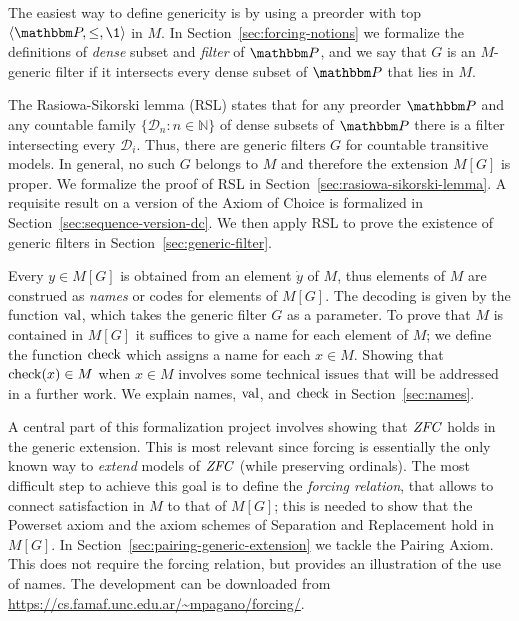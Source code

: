 The easiest way to define genericity is by using a preorder with top
$\lb\PP,\leq,\1\rb$ in $M$.   
In Section~\ref{sec:forcing-notions} we formalize the definitions of
\emph{dense} subset and  \emph{filter} of  $\PP$, and we say that  $G$
is an $M$-generic filter
if it intersects every dense subset of $\PP$ that lies in $M$.

The Rasiowa-Sikorski lemma (RSL) states that for any preorder $\PP$
and any countable family $\{\mathcal{D}_n : n\in\mathbb{N}\}$ of dense
subsets of $\PP$ there is a filter intersecting every
$\mathcal{D}_i$. Thus, there are generic filters $G$ for countable
transitive models. In general, no such $G$ belongs to $M$ and
therefore the extension $M[G]$ is proper. We formalize the proof of
RSL in Section~\ref{sec:rasiowa-sikorski-lemma}. A requisite result on
a version of the Axiom of Choice is formalized in
Section~\ref{sec:sequence-version-dc}. We then apply RSL to prove the
existence of generic filters in Section~\ref{sec:generic-filter}.

Every  $y \in M[G]$ is obtained from an element $\dot y$ of $M$, thus
elements of $M$ are construed as \emph{names} or codes for elements of
$M[G]$.
The decoding is given by the function
$\operatorname{val}$, which takes the generic filter $G$ as a parameter. To
prove that $M$ is contained in $M[G]$ it suffices to give a name for
each element of $M$; we define the function $\operatorname{check}$ which assigns
a name for each $x\in M$. Showing that $\operatorname{check}(x)\in M$
when $x\in M$ involves some technical issues that will
be addressed in a further work. We explain names, $\operatorname{val}$, and
$\operatorname{check}$ in Section~\ref{sec:names}.

A central part of this formalization project involves showing that
$\mathit{ZFC}$ holds in the generic extension. This is most relevant since
forcing is essentially the only known way to \emph{extend} models of
$\mathit{ZFC}$ (while preserving ordinals). The most difficult step to achieve
this goal is to define the \emph{forcing relation}, that allows to
connect satisfaction in $M$ to that of $M[G]$; this is needed to show
that the Powerset axiom and the axiom schemes of Separation and
Replacement hold in $M[G]$. In
Section~\ref{sec:pairing-generic-extension}
 we tackle the Pairing
Axiom. This does not require the forcing relation, but provides an
illustration of the use of names. The development can be downloaded
from \url{https://cs.famaf.unc.edu.ar/~mpagano/forcing/}.
   


